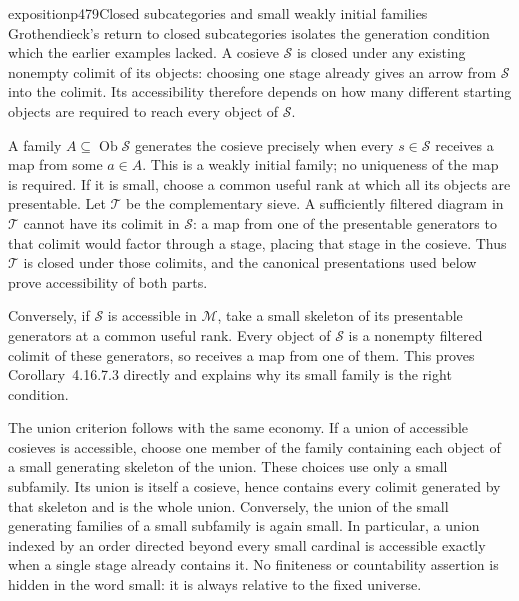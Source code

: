 \begin{dcomment}{exposition}{p479}{Closed subcategories and small weakly initial families}
Grothendieck's return to closed subcategories isolates the generation condition which the earlier examples lacked. A cosieve $\mathcal S$ is closed under any existing nonempty colimit of its objects: choosing one stage already gives an arrow from $\mathcal S$ into the colimit. Its accessibility therefore depends on how many different starting objects are required to reach every object of $\mathcal S$.

A family $A\subseteq\operatorname{Ob}\mathcal S$ generates the cosieve precisely when every $s\in\mathcal S$ receives a map from some $a\in A$. This is a weakly initial family; no uniqueness of the map is required. If it is small, choose a common useful rank at which all its objects are presentable. Let $\mathcal T$ be the complementary sieve. A sufficiently filtered diagram in $\mathcal T$ cannot have its colimit in $\mathcal S$: a map from one of the presentable generators to that colimit would factor through a stage, placing that stage in the cosieve. Thus $\mathcal T$ is closed under those colimits, and the canonical presentations used below prove accessibility of both parts.

Conversely, if $\mathcal S$ is accessible in $\mathcal M$, take a small skeleton of its presentable generators at a common useful rank. Every object of $\mathcal S$ is a nonempty filtered colimit of these generators, so receives a map from one of them. This proves Corollary~4.16.7.3 directly and explains why its small family is the right condition.

The union criterion follows with the same economy. If a union of accessible cosieves is accessible, choose one member of the family containing each object of a small generating skeleton of the union. These choices use only a small subfamily. Its union is itself a cosieve, hence contains every colimit generated by that skeleton and is the whole union. Conversely, the union of the small generating families of a small subfamily is again small. In particular, a union indexed by an order directed beyond every small cardinal is accessible exactly when a single stage already contains it. No finiteness or countability assertion is hidden in the word small: it is always relative to the fixed universe.
\end{dcomment}


